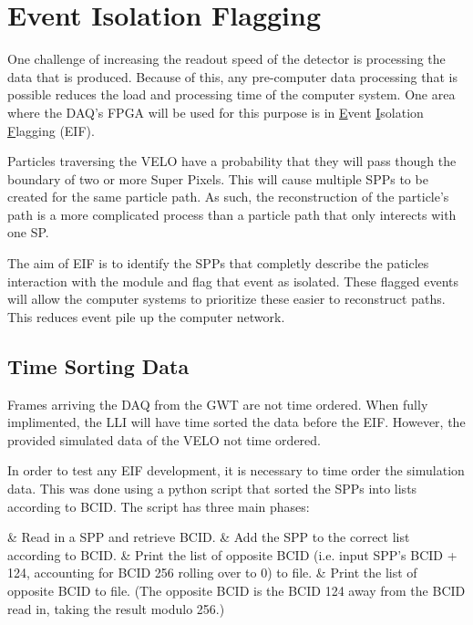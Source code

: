 \section{Event Isolation Flagging}
	
	One challenge of increasing the readout speed of the detector is processing the data that is produced.
	Because of this, any pre-computer data processing that is possible reduces the load and processing time of the computer system.
	One area where the DAQ's FPGA will be used for this purpose is in \underline{E}vent \underline{I}solation \underline{F}lagging (EIF).
	\par
	Particles traversing the VELO have a probability that they will pass though the boundary of two or more Super Pixels.
	This will cause multiple SPPs to be created for the same particle path.
	As such, the reconstruction of the particle's path is a more complicated process than a particle path that only interects with one SP.
	\par
	The aim of EIF is to identify the SPPs that completly describe the paticles interaction with the module and flag that event as isolated.
	These flagged events will allow the computer systems to prioritize these easier to reconstruct paths.
	This reduces event pile up the computer network.

	\subsection{Time Sorting Data}

		Frames arriving the DAQ from the GWT are not time ordered.
		When fully implimented, the LLI will have time sorted the data before the EIF.
		However, the provided simulated data of the VELO not time ordered.
		\par
		In order to test any EIF development, it is necessary to time order the simulation data.
		This was done using a python script that sorted the SPPs into lists according to BCID.
		The script has three main phases:

		\begin{easylist}
			& Read in a SPP and retrieve BCID.
			& Add the SPP to the correct list according to BCID.
			& Print the list of opposite BCID (i.e. input SPP's BCID + 124, accounting for BCID 256 rolling over to 0) to file.
			& Print the list of opposite BCID to file. (The opposite BCID is the BCID 124 away from the BCID read in, taking the result modulo 256.)
		\end{easylist}

